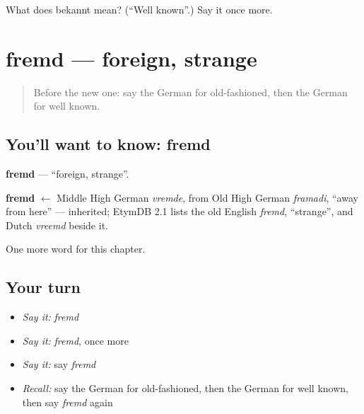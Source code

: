 \begin{tcolorbox}[breakable,colback=teal!4,colframe=teal!35!black,title={Before you move on}]
What does bekannt mean? (\textquotedblleft{}Well known\textquotedblright{}.) Say it once more.
\end{tcolorbox}
\section[fremd]{fremd — foreign, strange}

\label{lesson:GE-C169-fremd}



\begin{quote}
Before the new one: say the German for old-fashioned, then the German for well known.
\end{quote}

\subsection*{You'll want to know: fremd}
\textbf{fremd} — \textquotedblleft{}foreign, strange\textquotedblright{}.

\begin{cousinweb}
\textbf{fremd} $\leftarrow$ Middle High German \emph{vremde}, from Old High German \emph{framadi}, \textquotedblleft{}away from here\textquotedblright{} — inherited; EtymDB 2.1 lists the old English \emph{fremd}, \textquotedblleft{}strange\textquotedblright{}, and Dutch \emph{vreemd} beside it.
\end{cousinweb}

\begin{grammarlens}[title={What you've built}]
One more word for this chapter.
\end{grammarlens}

\subsection*{Your turn}
\begin{itemize}
\raggedright
  \item \emph{Say it:} \emph{fremd}
  \item \emph{Say it:} \emph{fremd}, once more
  \item \emph{Say it:} say \emph{fremd}
  \item \emph{Recall:} say the German for old-fashioned, then the German for well known, then say \emph{fremd} again
\end{itemize}

